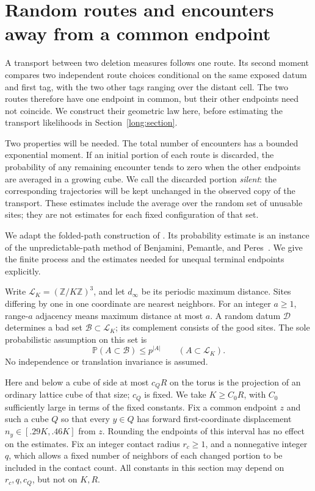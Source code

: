 \section{Random routes and encounters away from a common endpoint}\label{rt:section}\label{sec:routes}

A transport between two deletion measures follows one route.  Its second
moment compares two independent route choices conditional on the same
exposed datum and first tag, with the two other tags ranging over the
distant cell.  The two routes therefore have one endpoint in common, but their
other endpoints need not coincide.  We construct their geometric law
here, before estimating the transport likelihoods in
Section~\ref{long:section}.

Two properties will be needed.  The total number of encounters has a
bounded exponential moment.  If an initial portion of each route is
discarded, the probability of any remaining encounter tends to zero
when the other endpoints are averaged in a growing cube.  We call the
discarded portion \emph{silent}: the corresponding trajectories will be
kept unchanged in the observed copy of the transport.  These estimates
include the average over the random set of unusable sites; they are not
estimates for each fixed configuration of that set.

We adapt the folded-path construction of \cite[Section~7]{H}.  Its
probability estimate is an instance of the unpredictable-path method of
Benjamini, Pemantle, and Peres~\cite{BPP}.  We give the finite process
and the estimates needed for unequal terminal endpoints explicitly.

Write \(\mathcal L_K=(\mathbb Z/K\mathbb Z)^3\), and let
\(d_\infty\) be its periodic maximum distance.  Sites differing by one
in one coordinate are nearest neighbors.  For an integer \(a\ge1\),
range-\(a\) adjacency means maximum distance at most \(a\).
A random datum \(\mathcal D\) determines a bad set
\(\mathcal B\subset\mathcal L_K\); its complement consists of the
good sites.  The sole probabilistic assumption
on this set is
\begin{equation}\label{rt:bad-law}
 \mathbb P(A\subset\mathcal B)\le p^{|A|}
 \qquad(A\subset\mathcal L_K).
\end{equation}
No independence or translation invariance is assumed.

Here and below a cube of side at most \(c_QR\) on the torus is the
projection of an ordinary lattice cube of that size; \(c_Q\) is fixed.
We take \(K\ge C_0R\), with \(C_0\) sufficiently large in terms of
the fixed constants.  Fix a common endpoint \(z\) and such a cube \(Q\)
so that every \(y\in Q\) has forward first-coordinate displacement
\(n_y\in[.29K,.46K]\) from \(z\).  Rounding the endpoints of this
interval has no effect on the estimates.  Fix an integer contact radius
\(r_c\ge1\), and a nonnegative integer \(q\), which allows a fixed
number of neighbors of each changed portion to be included in the
contact count.  All constants in this section may depend on
\(r_c,q,c_Q\), but not on \(K,R\).

